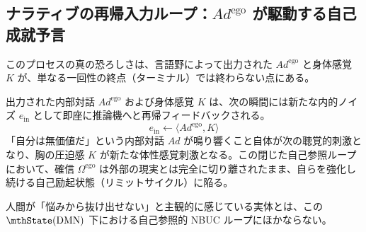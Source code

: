 
\subsection{ナラティブの再帰入力ループ：$Ad^{\mathrm{ego}}$ が駆動する自己成就予言}

このプロセスの真の恐ろしさは、言語野によって出力された $Ad^{\mathrm{ego}}$ と身体感覚 $K$ が、単なる一回性の終点（ターミナル）では終わらない点にある。

出力された内部対話 $Ad^{\mathrm{ego}}$ および身体感覚 $K$ は、次の瞬間には新たな内的ノイズ $e_{\mathrm{in}}$ として即座に推論機へと再帰フィードバックされる。
\begin{equation}
    e_{\mathrm{in}} \leftarrow \langle Ad^{\mathrm{ego}}, K \rangle
\end{equation}
「自分は無価値だ」という内部対話 $Ad$ が鳴り響くこと自体が次の聴覚的刺激となり、胸の圧迫感 $K$ が新たな体性感覚刺激となる。この閉じた自己参照ループにおいて、確信 $\Omega^{\mathrm{ego}}$ は外部の現実とは完全に切り離されたまま、自らを強化し続ける自己励起状態（リミットサイクル）に陥る。

人間が「悩みから抜け出せない」と主観的に感じている実体とは、この $\mthState(\mathrm{DMN})$ 下における自己参照的 NBUC ループにほかならない。

